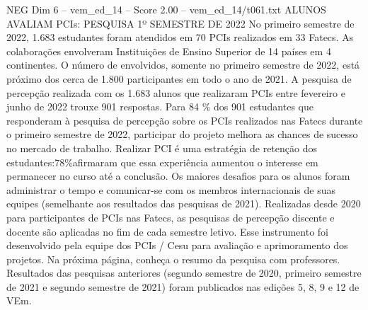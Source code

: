 \begin{textsample}{NEG Dim 6 – vem\_ed\_14 – Score 2.00 – vem\_ed\_14/t061.txt}  \label{ex:f6_neg_079}
ALUNOS AVALIAM PCIs: PESQUISA 1º SEMESTRE DE 2022 No primeiro semestre de 2022, 1.683 estudantes foram atendidos em 70 PCIs realizados em 33 Fatecs.
As colaborações envolveram Instituições de Ensino Superior de 14 países em 4 continentes.
O número de envolvidos, somente no primeiro semestre de 2022, está próximo dos cerca de 1.800 participantes em todo o ano de 2021.
A pesquisa de percepção realizada com os 1.683 alunos que realizaram PCIs entre fevereiro e junho de 2022 trouxe 901 respostas.
Para 84 \% dos 901 estudantes que responderam à pesquisa de percepção sobre os PCIs realizados nas Fatecs durante o primeiro semestre de 2022, participar do projeto melhora as chances de sucesso no mercado de trabalho.
Realizar PCI é uma estratégia de retenção dos estudantes:78\%afirmaram que essa experiência aumentou o interesse em permanecer no curso até a conclusão.
Os maiores desafios para os alunos foram administrar o tempo e comunicar-se com os membros internacionais de suas equipes (semelhante aos resultados das pesquisas de 2021).
Realizadas desde 2020 para participantes de PCIs nas Fatecs, as pesquisas de percepção discente e docente são aplicadas no fim de cada semestre letivo.
Esse instrumento foi desenvolvido pela equipe dos PCIs / Cesu para avaliação e aprimoramento dos projetos.
Na próxima página, conheça o resumo da pesquisa com professores.
Resultados das pesquisas anteriores (segundo semestre de 2020, primeiro semestre de 2021 e segundo semestre de 2021) foram publicados nas edições 5, 8, 9 e 12 de VEm.

\end{textsample}
